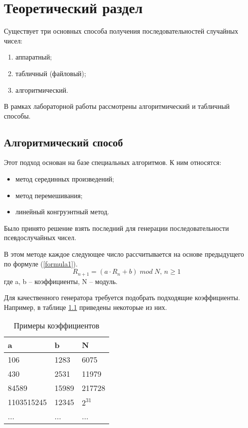 \chapter{Теоретический раздел}

Существует три основных способа получения последовательностей случайных чисел:
\begin{enumerate}
	\item аппаратный;
	
	\item табличный (файловый);
	
	\item алгоритмический.
\end{enumerate}

В рамках лабораторной работы рассмотрены алгоритмический и табличный способы. 

\section{Алгоритмический способ}
Этот подход основан на базе специальных алгоритмов. К ним относятся:
\begin{itemize}
	\item метод серединных произведений;
	
	\item метод перемешивания;
	
	\item линейный конгруэнтный метод.
\end{itemize}

Было принято решение взять последний для генерации последовательности псевдослучайных чисел.

В этом методе каждое следующее число рассчитывается на основе предыдущего по формуле (\ref{formula1}).
\begin{equation}\label{formula1}
R_{n + 1} = (a \cdot R_n + b)\;mod\;N,\, n \geq 1
\end{equation}
где a, b -- коэффициенты, N -- модуль.

Для качественного генератора требуется подобрать подходящие коэффициенты. Например, в таблице \ref{k} приведены некоторые из них.
\begin{table}[h]
	\begin{center}
		\caption{Примеры коэффициентов}
		\label{k}
		\begin{tabular}{| p{3cm} | p{3cm} | p{3cm}|}
			\hline
			\textbf{a} 			& \textbf{b} 	& \textbf{N} \\
			\hline
			106 				& 1283 			& 6075 \\ 
			\hline
			430 				& 2531  		& 11979 \\ 
			\hline
			84589 				& 15989 		& 217728 \\ 
			\hline
			1103515245 			& 12345 		& $2^{31}$ \\ 
			\hline
			... 				& ... 			& ... \\ 
			\hline
		\end{tabular}
	\end{center}
\end{table} 

